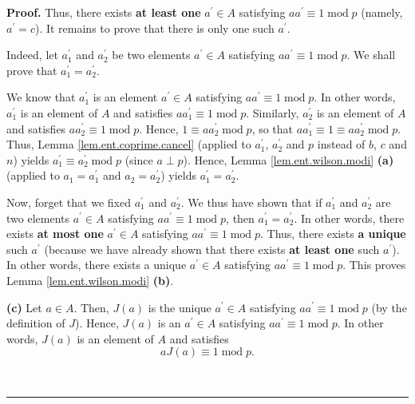 \documentclass[numbers=enddot,12pt,final,onecolumn,notitlepage]{scrartcl}%
\numberwithin{exer}{subsection}
\theoremstyle{definition}
\newenvironment{proof}[1][Proof]{\noindent\textbf{#1.} }{\ \rule{0.5em}{0.5em}}
\begin{document}
\begin{proof}
Thus, there exists \textbf{at least one} $a^{\prime}\in A$ satisfying
$aa^{\prime}\equiv1\operatorname{mod}p$ (namely, $a^{\prime}=c$). It remains
to prove that there is only one such $a^{\prime}$.

Indeed, let $a_{1}^{\prime}$ and $a_{2}^{\prime}$ be two elements $a^{\prime
}\in A$ satisfying $aa^{\prime}\equiv1\operatorname{mod}p$. We shall prove
that $a_{1}^{\prime}=a_{2}^{\prime}$.

We know that $a_{1}^{\prime}$ is an element $a^{\prime}\in A$ satisfying
$aa^{\prime}\equiv1\operatorname{mod}p$. In other words, $a_{1}^{\prime}$ is
an element of $A$ and satisfies $aa_{1}^{\prime}\equiv1\operatorname{mod}p$.
Similarly, $a_{2}^{\prime}$ is an element of $A$ and satisfies $aa_{2}%
^{\prime}\equiv1\operatorname{mod}p$. Hence, $1\equiv aa_{2}^{\prime
}\operatorname{mod}p$, so that $aa_{1}^{\prime}\equiv1\equiv aa_{2}^{\prime
}\operatorname{mod}p$. Thus, Lemma \ref{lem.ent.coprime.cancel} (applied to
$a_{1}^{\prime}$, $a_{2}^{\prime}$ and $p$ instead of $b$, $c$ and $n$) yields
$a_{1}^{\prime}\equiv a_{2}^{\prime}\operatorname{mod}p$ (since $a\perp p$).
Hence, Lemma \ref{lem.ent.wilson.modi} \textbf{(a)} (applied to $a_{1}%
=a_{1}^{\prime}$ and $a_{2}=a_{2}^{\prime}$) yields $a_{1}^{\prime}%
=a_{2}^{\prime}$.

Now, forget that we fixed $a_{1}^{\prime}$ and $a_{2}^{\prime}$. We thus have
shown that if $a_{1}^{\prime}$ and $a_{2}^{\prime}$ are two elements
$a^{\prime}\in A$ satisfying $aa^{\prime}\equiv1\operatorname{mod}p$, then
$a_{1}^{\prime}=a_{2}^{\prime}$. In other words, there exists \textbf{at most
one} $a^{\prime}\in A$ satisfying $aa^{\prime}\equiv1\operatorname{mod}p$.
Thus, there exists \textbf{a unique} such $a^{\prime}$ (because we have
already shown that there exists \textbf{at least one} such $a^{\prime}$). In
other words, there exists a unique $a^{\prime}\in A$ satisfying $aa^{\prime
}\equiv1\operatorname{mod}p$. This proves Lemma \ref{lem.ent.wilson.modi}
\textbf{(b)}.

\textbf{(c)} Let $a\in A$. Then, $J\left(  a\right)  $ is the unique
$a^{\prime}\in A$ satisfying $aa^{\prime}\equiv1\operatorname{mod}p$ (by the
definition of $J$). Hence, $J\left(  a\right)  $ is an $a^{\prime}\in A$
satisfying $aa^{\prime}\equiv1\operatorname{mod}p$. In other words, $J\left(
a\right)  $ is an element of $A$ and satisfies%
\begin{equation}
aJ\left(  a\right)  \equiv1\operatorname{mod}p.
\label{pf.lem.ent.wilson.modi.b.aJa}%
\end{equation}



\end{proof}
\end{document}
